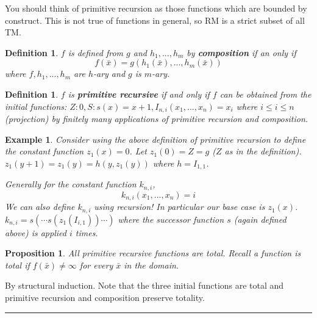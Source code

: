 \documentclass[twoside]{article}
\newtheorem{proposition}[theorem]{Proposition}
\newtheorem{definition}[theorem]{Definition}
\newtheorem{example}[theorem]{Example}
\newenvironment{proof}{{\bf Proof:}}{\hfill\rule{2mm}{2mm}}
\begin{document}
You should think of primitive recursion as those functions which are bounded by construct. This is not true of functions in general, so RM is a strict subset of all TM.

\begin{definition}
$f$ is defined from $g$ and $h_1, ..., h_m$ by \textbf{composition} if an only if 
\[f(\bar{x}) = g\left( h_1(\bar{x}), ..., h_m(\bar{x})\right)\]
where $f, h_1, ..., h_m$ are $h$-ary and $g$ is $m$-ary.
\end{definition}

\begin{definition}
$f$ is \textbf{primitive recursive} if and only if $f$ can be obtained from the initial functions: $Z: 0, S: s(x) = x+1, I_{n,i}(x_1, ..., x_n) = x_i$ where $i\leq i\leq n$ (projection) by finitely many applications of primitive recursion and composition.
\end{definition}

\begin{example}
Consider using the above definition of primitive recursion to define the constant function $z_1(x) = 0$. Let $z_1(0) = Z = g$ ($Z$ as in the definition). $z_1(y+1) = z_1(y) = h(y, z_1(y))$ where $h = I_{1,1}$.

Generally for the constant function $k_{n,i}$, 
\[k_{n,i}(x_1, ..., x_n) = i \]
We can also define $k_{n,i}$ using recursion! In particular our base case is $z_1(x)$. $k_{n,i} = s\left(\cdots s\left(z_1\left(I_{i,1}\right)\right) \cdots \right)$ where the successor function $s$ (again defined above) is applied $i$ times. 
\end{example}

\begin{proposition}
All primitive recursive functions are \emph{total}. Recall a function is \emph{total} if $f(\bar{x}) \neq \infty$ for every $\bar{x}$ in the domain.
\end{proposition}
\begin{proof}
By structural induction. Note that the three initial functions are total and primitive recursion and composition preserve totality.
\end{proof}
\end{document}
